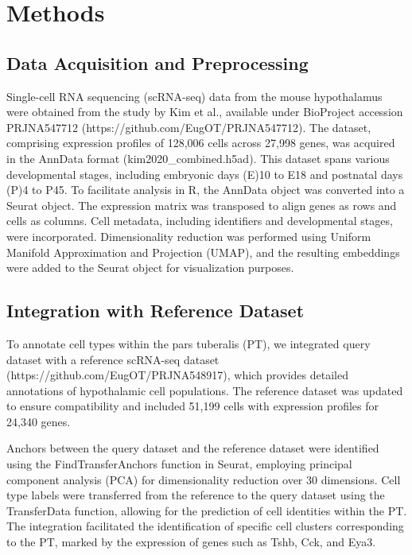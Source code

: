 \documentclass[
  number,
  preprint]{elsarticle}
\begin{document}
\section{Methods}\label{sec-data-methods}

\subsection{Data Acquisition and
Preprocessing}\label{data-acquisition-and-preprocessing}

Single-cell RNA sequencing (scRNA-seq) data from the mouse hypothalamus
were obtained from the study by Kim et al.\citep{kim2020}, available
under BioProject accession PRJNA547712
(https://github.com/EugOT/PRJNA547712). The dataset, comprising
expression profiles of 128,006 cells across 27,998 genes, was acquired
in the AnnData format (kim2020\_combined.h5ad). This dataset spans
various developmental stages, including embryonic days (E)10 to E18 and
postnatal days (P)4 to P45. To facilitate analysis in R, the AnnData
object was converted into a Seurat
object\citep{haoDictionaryLearningIntegrative2023, stuartComprehensiveIntegrationSingleCell2019}.
The expression matrix was transposed to align genes as rows and cells as
columns. Cell metadata, including identifiers and developmental stages,
were incorporated. Dimensionality reduction was performed using Uniform
Manifold Approximation and Projection
(UMAP)\citep{mcinnes2018, kobakInitializationCriticalPreserving2021},
and the resulting embeddings were added to the Seurat object for
visualization purposes.

\subsection{Integration with Reference
Dataset}\label{integration-with-reference-dataset}

To annotate cell types within the pars tuberalis (PT), we integrated
query dataset\citep{kim2020} with a reference scRNA-seq dataset
(https://github.com/EugOT/PRJNA548917), which provides detailed
annotations of hypothalamic cell
populations\citep{romanovMolecularDesignHypothalamus2020}. The reference
dataset was updated to ensure compatibility and included 51,199 cells
with expression profiles for 24,340 genes.

Anchors between the query dataset\citep{kim2020} and the reference
dataset\citep{romanovMolecularDesignHypothalamus2020} were identified
using the FindTransferAnchors function in
Seurat\citep{haoDictionaryLearningIntegrative2023, stuartComprehensiveIntegrationSingleCell2019},
employing principal component analysis (PCA) for dimensionality
reduction over 30 dimensions. Cell type labels were transferred from the
reference to the query dataset using the TransferData function, allowing
for the prediction of cell identities within the
PT\citep{haoDictionaryLearningIntegrative2023}. The integration
facilitated the identification of specific cell clusters corresponding
to the PT, marked by the expression of genes such as Tshb, Cck, and
Eya3.
\end{document}
